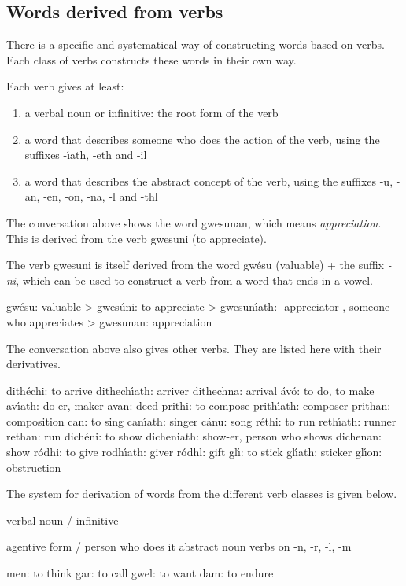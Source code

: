\subsection{Words derived from verbs}

There is a specific and systematical way of constructing words based on verbs. Each class of verbs constructs these words in their own way.

Each verb gives at least:
\begin{enumerate}
\item a verbal noun or infinitive: the root form of the verb
\item a word that describes someone who does the action of the verb, using the suffixes -\'{\i}ath, -eth and -il
\item a word that describes the abstract concept of the verb, using the suffixes -u, -an, -en, -on, -na, -l and -thl
\end{enumerate}

The conversation above shows the word gwesunan, which means \textit{appreciation}. This is derived from the verb gwesuni (to appreciate).

The verb gwesuni is itself derived from the word gw\'{e}su (valuable) + the suffix \textit{-ni}, which can be used to construct a verb from a word that ends in a vowel.

gw\'{e}su: valuable
> gwes\'{u}ni: to appreciate
> gwesun\'{\i}ath: -appreciator-, someone who appreciates
> gwesunan: appreciation

The conversation above also gives other verbs. They are listed here with their derivatives.

dith\'{e}chi: to arrive
dithech\'{\i}ath: arriver
dithechna: arrival
\'{a}v\'{o}: to do, to make
av\'{\i}ath: do-er, maker
avan: deed
prithi: to compose
prith\'{\i}ath: composer
prithan: composition
can: to sing
can\'{\i}ath: singer
c\'{a}nu: song
r\'{e}thi: to run
reth\'{\i}ath: runner
rethan: run
dich\'{e}ni: to show
dicheniath: show-er, person who shows
dichenan: show
r\'{o}dhi: to give
rodh\'{\i}ath: giver
r\'{o}dhl: gift
gl\'{\i}: to stick
gl\'{\i}ath: sticker
gl\'{\i}on: obstruction

The system for derivation of words from the different verb classes is given below.
 
verbal noun / infinitive
 
	agentive form / person who does it 	abstract noun
verbs on -n, -r, -l, -m

men: to think
gar: to call
gwel: to want
dam: to endure

